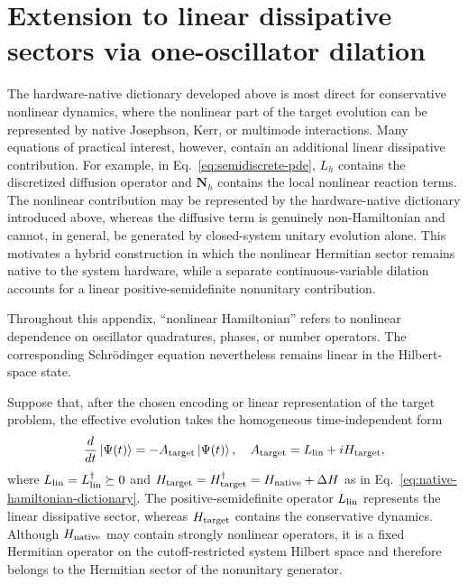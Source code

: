 \documentclass[pra,twocolumn,superscriptaddress,nofootinbib,floatfix]{revtex4-2}
\theoremstyle{remark}
\newcommand{\revcolor}{\color{blue}}
\DeclareRobustCommand{\rev}[1]{{\revcolor #1}}
\begin{document}
\section{Extension to linear dissipative sectors via one-oscillator dilation}
\label{app:lchs}

The hardware-native dictionary developed above is most direct for conservative nonlinear dynamics, where the nonlinear part of the target evolution can be represented by native Josephson, Kerr, or multimode interactions. Many equations of practical interest, however, contain an additional linear dissipative contribution. \rev{For example, in Eq.~\eqref{eq:semidiscrete-pde}, \(L_h\) contains the discretized diffusion operator and \(\mathbf N_h\) contains the local nonlinear reaction terms.} The nonlinear contribution may be represented by the hardware-native dictionary introduced above, whereas the diffusive term is genuinely non-Hamiltonian and cannot, in general, be generated by closed-system unitary evolution alone. This motivates a hybrid construction in which the nonlinear Hermitian sector remains native to the system hardware, while a separate continuous-variable dilation accounts for a linear positive-semidefinite nonunitary contribution.

\rev{Throughout this appendix, ``nonlinear Hamiltonian'' refers to nonlinear dependence on oscillator quadratures, phases, or number operators.} The corresponding Schr\"odinger equation nevertheless remains linear in the Hilbert-space state.

Suppose that, after the chosen encoding or linear representation of the target problem, the effective evolution takes the homogeneous time-independent form
\begin{align}
\frac{d}{dt}\ket{\Psi(t)}=-A_{\rm target}\ket{\Psi(t)},\quad A_{\rm target}=L_{\rm lin}+iH_{\rm target},
\label{eq:general-nonunitary-evolution}
\end{align}
\rev{where \(L_{\rm lin}=L_{\rm lin}^{\dagger}\succeq0\) and \(H_{\rm target}=H_{\rm target}^{\dagger}=H_{\rm native}+\Delta H\) as in Eq.~\eqref{eq:native-hamiltonian-dictionary}.} The positive-semidefinite operator \(L_{\rm lin}\) represents the linear dissipative sector, whereas \(H_{\rm target}\) contains the conservative dynamics. \rev{Although \(H_{\rm native}\) may contain strongly nonlinear operators, it is a fixed Hermitian operator on the cutoff-restricted system Hilbert space and therefore belongs to the Hermitian sector of the nonunitary generator.}
\end{document}
